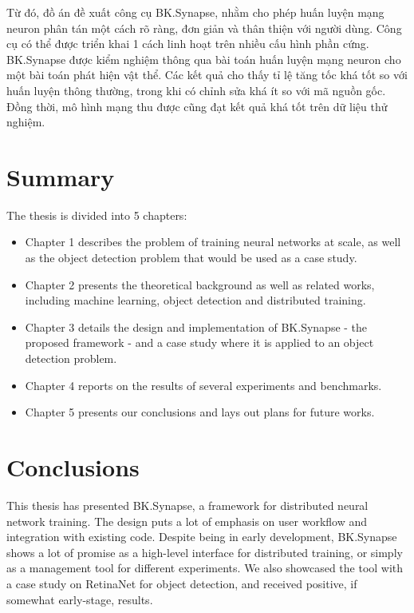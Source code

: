 \documentclass[a4paper, 13pt, oneside]{report}
\begin{document}
Từ đó, đồ án đề xuất công cụ BK.Synapse, nhằm cho phép huấn luyện mạng neuron phân tán một cách rõ ràng, đơn giản và thân thiện với người dùng. Công cụ có thể được triển khai 1 cách linh hoạt trên nhiều cấu hình phần cứng. BK.Synapse được kiểm nghiệm thông qua bài toán huấn luyện mạng neuron cho một bài toán phát hiện vật thể. Các kết quả cho thấy tỉ lệ tăng tốc khá tốt so với huấn luyện thông thường, trong khi có chỉnh sửa khá ít so với mã nguồn gốc. Đồng thời, mô hình mạng thu được cũng đạt kết quả khá tốt trên dữ liệu thử nghiệm.

\chapter*{Summary}
The thesis is divided into 5 chapters:
\begin{itemize}
    \item Chapter 1 describes the problem of training neural networks at scale, as well as the object detection problem that would be used as a case study.
    \item Chapter 2 presents the theoretical background as well as related works, including machine learning, object detection and distributed training.
    \item Chapter 3 details the design and implementation of BK.Synapse - the proposed framework - and a case study where it is applied to an object detection problem.
    \item Chapter 4 reports on the results of several experiments and benchmarks.
    \item Chapter 5 presents our conclusions and lays out plans for future works.
\end{itemize}

\pagebreak
{}
\tableofcontents
\pagebreak
{}
\setcounter{page}{1}
\listoffigures
\listoftables

\printglossary[type=\acronymtype,style=long, title=List of Abbreviations]
\printglossary
\pagebreak



\pagebreak



\chapter{Conclusions}
This thesis has presented BK.Synapse, a framework for distributed neural network training. The design puts a lot of emphasis on user workflow and integration with existing code. Despite being in early development, BK.Synapse shows a lot of promise as a high-level interface for distributed training, or simply as a management tool for different experiments. We also showcased the tool with a case study on RetinaNet for object detection, and received positive, if somewhat early-stage, results.
\end{document}
